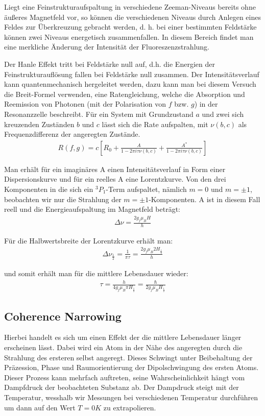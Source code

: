 \documentclass[12pt]{article}
\begin{document}
Liegt eine Feinstrukturaufspaltung in verschiedene Zeeman-Niveaus bereits ohne äußeres Magnetfeld vor,
so können die verschiedenen Niveaus durch Anlegen eines Feldes zur Überkreuzung gebracht werden, d. h. bei
einer bestimmten Feldstärke können zwei Niveaus energetisch zusammenfallen. In diesem Bereich findet man eine
merkliche Änderung der Intensität der Fluoreszenzstrahlung.

Der Hanle Effekt tritt bei Feldstärke null auf, d.h. die Energien der Feinstrukturauflösung fallen bei Feldstärke
null zusammen. Der Intensitätsverlauf kann quantenmechanisch hergeleitet werden, dazu kann man bei diesem Versuch die
Breit-Formel verwenden, eine Ratengleichung, welche die Absorption und Reemission von Photonen (mit der Polarisation
von $f$ bzw. $g$) in der Resonanzzelle beschreibt. Für ein System mit Grundzustand $a$ und zwei sich kreuzenden Zuständen
$b$ und $c$ lässt sich die Rate aufspalten, mit $\nu(b,c)$ als Frequenzdifferenz der angeregten Zustände.
\begin{align}
 R(f,g)=c\left[ R_0+\frac{A}{1-2\pi i \tau \nu (b,c)}+\frac{A^*}{1-2\pi i \tau \nu (b,c)}\right]
\end{align}

Man erhält für ein imaginäres A einen Intensitätsverlauf in Form einer Dispersionskurve und für ein reelles A 
eine Lorentzkurve. Von den drei Komponenten in die sich ein $^3P_1$-Term aufspaltet, nämlich $m = 0$ und $m = \pm 1$,
beobachten wir nur die Strahlung der $m = \pm1$-Komponenten. A ist in diesem Fall reell und die Energieaufspaltung im Magnetfeld beträgt:
\begin{align}
 \Delta \nu = \frac{2 g_j \mu_B H}{h}
\end{align}

Für die Halbwertsbreite der Lorentzkurve erhält man:
\begin{align}
 \Delta \nu_{\frac{1}{2}} = \frac{1}{\pi \tau} = \frac{2 g_j \mu_B 2 H_{\frac{1}{2}}}{h}
\end{align}

und somit erhält man für die mittlere Lebensdauer wieder:
\begin{align}
 \label{livetime_quantum} \tau = \frac{h}{4 g_j \mu_B \pi H_{\frac{1}{2}}} = \frac{\hbar}{2 g_j \mu_B H_{\frac{1}{2}}}
\end{align}

\subsection{Coherence Narrowing}
Hierbei handelt es sich um einen Effekt der die mittlere Lebensdauer länger erscheinen lässt. Dabei wird ein Atom in der Nähe
des angeregten durch die Strahlung des ersteren selbst angeregt. Dieses Schwingt unter Beibehaltung der Präzession, Phase und
Raumorientierung der Dipolschwingung des ersten Atoms. Dieser Prozess kann mehrfach auftreten, seine Wahrscheinlichkeit hängt
vom Dampfdruck der beobachteten Substanz ab. Der Dampdruck steigt mit der Temperatur, wesshalb wir Messungen bei verschiedenen
Temperatur durchführen um dann auf den Wert $T=0K$ zu extrapolieren.
\newpage
\end{document}
